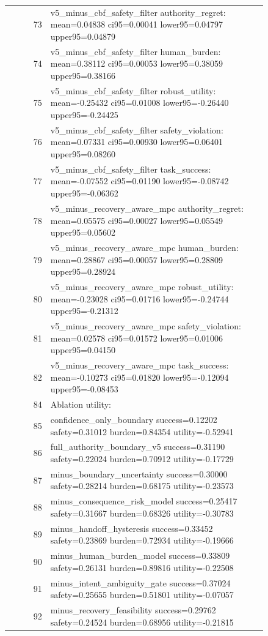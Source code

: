 \documentclass{article}
\begin{document}
\begin{center}
\begin{longtable}{rp{0.84\linewidth}}
73 & v5\_minus\_cbf\_safety\_filter authority\_regret: mean=0.04838 ci95=0.00041 lower95=0.04797 upper95=0.04879\\
74 & v5\_minus\_cbf\_safety\_filter human\_burden: mean=0.38112 ci95=0.00053 lower95=0.38059 upper95=0.38166\\
75 & v5\_minus\_cbf\_safety\_filter robust\_utility: mean=-0.25432 ci95=0.01008 lower95=-0.26440 upper95=-0.24425\\
76 & v5\_minus\_cbf\_safety\_filter safety\_violation: mean=0.07331 ci95=0.00930 lower95=0.06401 upper95=0.08260\\
77 & v5\_minus\_cbf\_safety\_filter task\_success: mean=-0.07552 ci95=0.01190 lower95=-0.08742 upper95=-0.06362\\
78 & v5\_minus\_recovery\_aware\_mpc authority\_regret: mean=0.05575 ci95=0.00027 lower95=0.05549 upper95=0.05602\\
79 & v5\_minus\_recovery\_aware\_mpc human\_burden: mean=0.28867 ci95=0.00057 lower95=0.28809 upper95=0.28924\\
80 & v5\_minus\_recovery\_aware\_mpc robust\_utility: mean=-0.23028 ci95=0.01716 lower95=-0.24744 upper95=-0.21312\\
81 & v5\_minus\_recovery\_aware\_mpc safety\_violation: mean=0.02578 ci95=0.01572 lower95=0.01006 upper95=0.04150\\
82 & v5\_minus\_recovery\_aware\_mpc task\_success: mean=-0.10273 ci95=0.01820 lower95=-0.12094 upper95=-0.08453\\
84 & Ablation utility:\\
85 & confidence\_only\_boundary success=0.12202 safety=0.31012 burden=0.84354 utility=-0.52941\\
86 & full\_authority\_boundary\_v5 success=0.31190 safety=0.22024 burden=0.70912 utility=-0.17729\\
87 & minus\_boundary\_uncertainty success=0.30000 safety=0.28214 burden=0.68175 utility=-0.23573\\
88 & minus\_consequence\_risk\_model success=0.25417 safety=0.31667 burden=0.68326 utility=-0.30783\\
89 & minus\_handoff\_hysteresis success=0.33452 safety=0.23869 burden=0.72934 utility=-0.19666\\
90 & minus\_human\_burden\_model success=0.33809 safety=0.26131 burden=0.89816 utility=-0.22508\\
91 & minus\_intent\_ambiguity\_gate success=0.37024 safety=0.25655 burden=0.51801 utility=-0.07057\\
92 & minus\_recovery\_feasibility success=0.29762 safety=0.24524 burden=0.68956 utility=-0.21815\\

\end{longtable}
\end{center}
\end{document}

